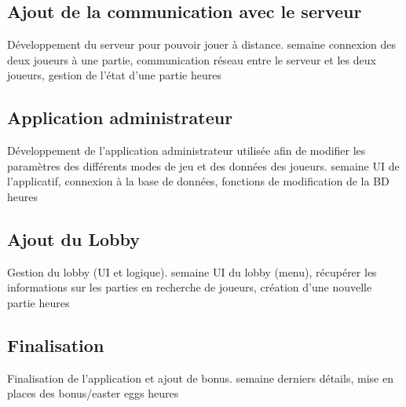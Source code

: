 \documentclass[a4paper,11pt]{article}
\begin{document}
		\subsection{Ajout de la communication avec le serveur}
		\begin{enumerate}[labelwidth=5em,leftmargin=8em]
			\objectif Développement du serveur pour pouvoir jouer à distance.
			 semaine
			\partageTache connexion des deux joueurs à une partie, communication réseau entre le serveur et les deux joueurs, gestion de l'état d'une partie
			 heures
		\end{enumerate}
		\subsection{Application administrateur}
		\begin{enumerate}[labelwidth=5em,leftmargin=8em]
			\objectif Développement de l'application administrateur utilisée afin de modifier les paramètres des différents modes de jeu et des données des joueurs.
			 semaine
			\partageTache UI de l'applicatif, connexion à la base de données, fonctions de modification de la BD
			 heures
		\end{enumerate}
		\subsection{Ajout du Lobby}
		\begin{enumerate}[labelwidth=5em,leftmargin=8em]
			\objectif Gestion du lobby (UI et logique).
			 semaine
			\partageTache UI du lobby (menu), récupérer les informations sur les parties en recherche de joueurs, création d'une nouvelle partie 
			 heures
		\end{enumerate}
		\subsection{Finalisation}
		\begin{enumerate}[labelwidth=5em,leftmargin=8em]
			\objectif Finalisation de l'application et ajout de bonus.
			 semaine
			\partageTache derniers détails, mise en places des bonus/easter eggs
			 heures
		\end{enumerate}
\end{document}
